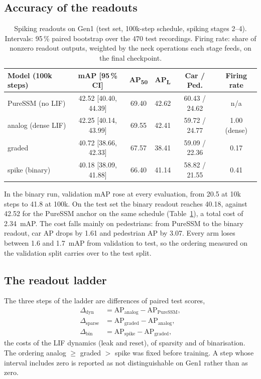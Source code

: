 \documentclass[11pt, a4paper]{report}
\begin{document}
\subsection{Accuracy of the readouts}
\label{subsec:spk_accuracy}
\begin{table}[htbp]
\centering
\caption{Spiking readouts on Gen1 (test set, 100k-step schedule, spiking stages 2--4). Intervals: 95\,\%
paired bootstrap over the 470 test recordings. Firing rate: share of nonzero readout outputs, weighted by the
neck operations each stage feeds, on the final checkpoint.}
\label{tab:spiking_ablation}
\begin{tabular}{lccccc}
\toprule
\textbf{Model (100k steps)} & \textbf{mAP [95\,\% CI]} & \textbf{AP\textsubscript{50}} & \textbf{AP\textsubscript{L}} & \textbf{Car / Ped.} & \textbf{Firing rate} \\
\midrule
PureSSM (no LIF)   & 42.52 [40.40, 44.39] & 69.40 & 42.62 & 60.43 / 24.62 & n/a \\
analog (dense LIF) & 42.25 [40.14, 43.99] & 69.55 & 42.41 & 59.72 / 24.77 & 1.00 (dense) \\
graded             & 40.72 [38.66, 42.33] & 67.57 & 38.41 & 59.09 / 22.36 & 0.17 \\
spike (binary)     & 40.18 [38.09, 41.88] & 66.40 & 41.14 & 58.82 / 21.55 & 0.41 \\
\bottomrule
\end{tabular}
\end{table}

In the binary run, validation mAP rose at every evaluation, from 20.5 at 10k steps to 41.8 at 100k. On the
test set the binary readout reaches 40.18, against 42.52 for the PureSSM anchor on the same schedule
(Table~\ref{tab:spiking_ablation}), a total cost of 2.34~mAP. The cost falls mainly on pedestrians: from
PureSSM to the binary readout, car AP drops by 1.61 and pedestrian AP by 3.07. Every arm loses between 1.6
and 1.7~mAP from validation to test, so the ordering measured on the validation split carries over to the
test split.

\subsection{The readout ladder}
\label{subsec:spk_ladder}
The three steps of the ladder are differences of paired test scores,
\begin{equation}
\begin{aligned}
  \Delta_{\mathrm{dyn}} &= \mathrm{AP}_{\mathrm{analog}} - \mathrm{AP}_{\mathrm{PureSSM}},\\
  \Delta_{\mathrm{sparse}} &= \mathrm{AP}_{\mathrm{graded}} - \mathrm{AP}_{\mathrm{analog}},\\
  \Delta_{\mathrm{bin}} &= \mathrm{AP}_{\mathrm{spike}} - \mathrm{AP}_{\mathrm{graded}},
\end{aligned}
  \label{eq:ladder}
\end{equation}
the costs of the LIF dynamics (leak and reset), of sparsity and of binarisation. The ordering
analog $\geq$ graded $>$ spike was fixed before training. A step whose interval includes zero is reported as
not distinguishable on Gen1 rather than as zero.
\end{document}
